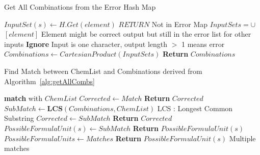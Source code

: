 \documentclass[conference]{IEEEtran}
\begin{document}
\begin{algorithm}
\small
\caption{Get All Combinations from the Error Hash Map}
\begin{algorithmic}[1]
		\State $InputSet(s) \leftarrow H.Get(element)$ 
			\State $RETURN$ \Comment Not in Error Map
		\Else
				\State $InputSets =\cup$ $[element]$ 
				\Statex \Comment Element might be correct output but still in the error list for other inputs
			\Else
				\State \textbf{Ignore}
				\Statex \Comment Input is one character, output length $>$ 1 means error
			\EndIf
		\EndIf
	\EndFor
\State $Combinations \leftarrow CartesianProduct(InputSets)$ %
\State  \textbf{Return} {$Combinations$}
\EndProcedure
\Statex
\end{algorithmic}
\label{alg:getAllCombs}
\end{algorithm}

\begin{algorithm}
\small
\caption{Find Match between ChemList and Combinations derived from Algorithm~\ref{alg:getAllCombs}}
\begin{algorithmic}[1]
		\State \textbf{match} {with $ChemList$}
	\EndFor
		\State $Corrected \leftarrow Match$
		\State  \textbf{Return} {$Corrected$}
		\State $SubMatch \leftarrow \textbf{LCS}(Combinations,ChemList)$ 
		\Statex \Comment LCS : Longest Common Substring
			\State $Corrected \leftarrow SubMatch$
			\State  \textbf{Return} {$Corrected$}
		\Else
			\State $PossibleFormulaUnit(s) \leftarrow SubMatch$
			\State  \textbf{Return} {$PossibleFormulaUnit(s)$}
		\EndIf
	\Else
		\State $PossibleFormulaUnits \leftarrow Matches$
		\State  \textbf{Return} {$PossibleFormulaUnit(s)$}
		\Statex \Comment Multiple matches
	\EndIf
\EndProcedure
\end{algorithmic}
\label{alg:findMatch}
\end{algorithm}
\end{document}
